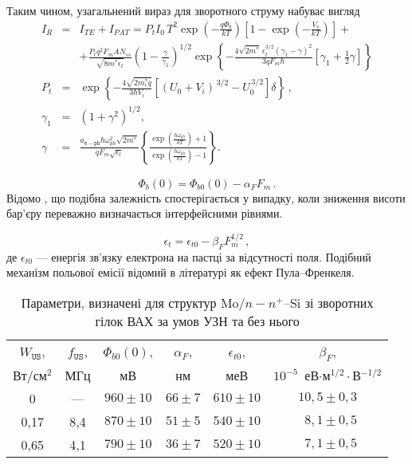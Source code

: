 \documentclass[a5paper,10pt,twoside,openany,article]{memoir} %
\begin{document}
Таким чином, узагальнений вираз для зворотного струму набуває вигляд
\begin{eqnarray}
\label{eqIgen}
 I_R&=&I_{TE}+I_{P\!AT}=P_tI_0\,T^2\exp\left(-\frac{q\Phi_b}{kT}\right)\left[1-\exp\left(-\frac{V_s}{kT}\right)\right]+\\
 &&+\frac{P_tq^2F_mAN_{ss}}{\sqrt{8m^*\epsilon_t}}\left(1-\frac{\gamma}{\gamma_1}\right)^{1/2}\exp
    \left\{-\frac{4\sqrt{2m^*}\,\epsilon_t^{3/2}\left(\gamma_1-\gamma\right)^2}{3qF_m\hbar} \nonumber
    [\gamma_1+\frac{1}{2}\gamma]\right\}\\ \nonumber
        P_t&=&\exp\left\{-\frac{4\sqrt{2m_i^*q}}{3\hbar V_i}\left[(U_0+V_i)^{\,3/2}-U_0^{\,3/2}\right]\delta\right\}\,,\\ \nonumber
    \gamma_1&=&(1+\gamma^2)^{1/2},\\ \nonumber
    \gamma&=&\frac{a_\mathtt{e-ph}\hbar\omega_{ph}^2\sqrt{2m^*}}{qF_m\sqrt{\epsilon_t}}
    \left\{\frac{\exp\left(\frac{\hbar\omega_{ph}}{kT}\right)+1}{\exp\left(\frac{\hbar\omega_{ph}}{kT}\right)-1}\right\}.   \nonumber 
\end{eqnarray}

\begin{equation}\label{eqFbE}
    \Phi_{b}(0)=\Phi_{b0}(0)-\alpha_{F} F_m\,.
\end{equation}
Відомо \cite{Tung:MSE},
що подібна залежність спостерігається у випадку, коли зниження висоти бар'єру переважно визначається інтерфейсними рівнями.

\begin{equation}\label{eqEtE}
    \epsilon_t=\epsilon_{t0}-\beta_F F_m^{1/2}\,,
\end{equation}
де
$\epsilon_{t0}$ --- енергія зв'язку електрона на пастці за відсутності поля.
Подібний механізм польової емісії відомий в літературі як ефект Пула--Френкеля.


\begin{table}
\caption{Параметри, визначені для структур Mo$/n-n^+$--Si зі зворотних гілок ВАХ за умов УЗН та без нього}
\label{tabSDBParZv}
\centering
\begin{tabular}{|c|c|c|c|c|c|}
\hline
$W_\mathtt{US}$, &$f_\mathtt{US}$,&$\Phi_{b0}(0)$,&$\alpha_F$,&$\epsilon_{t0}$,&$\beta_F$,\\
Вт/см$^2$&МГц&мВ&нм&меВ&$10^{-5}$~еВ$\cdot$м$^{1/2}\cdot$В$^{-1/2}$\\\hline
0&---&$960\pm10$&$66\pm7$&$610\pm10$&$10,5\pm0,3$\\\hline
0,17&8,4&$870\pm10$&$51\pm5$&$540\pm10$&$\;\:8,1\pm0,5$\\\hline
0,65&4,1&$790\pm10$&$36\pm7$&$520\pm10$&$\;\:7,1\pm0,5$\\\hline
\end{tabular}
\end{table}
\end{document}

